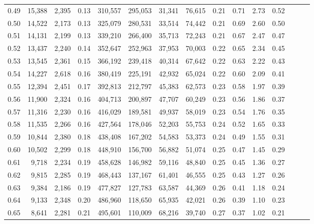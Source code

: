 \begin{tabular}{rrrrrrrrrrrrrrr}
0.49 &  15,388 &  2,395 &  0.13 &  310,557 &  295,053 &   31,341 &   76,615 &  0.21 &  0.71 &  2.73 &      0.52 \\
0.50 &  14,522 &  2,173 &  0.13 &  325,079 &  280,531 &   33,514 &   74,442 &  0.21 &  0.69 &  2.60 &      0.50 \\
0.51 &  14,131 &  2,199 &  0.13 &  339,210 &  266,400 &   35,713 &   72,243 &  0.21 &  0.67 &  2.47 &      0.47 \\
0.52 &  13,437 &  2,240 &  0.14 &  352,647 &  252,963 &   37,953 &   70,003 &  0.22 &  0.65 &  2.34 &      0.45 \\
0.53 &  13,545 &  2,361 &  0.15 &  366,192 &  239,418 &   40,314 &   67,642 &  0.22 &  0.63 &  2.22 &      0.43 \\
0.54 &  14,227 &  2,618 &  0.16 &  380,419 &  225,191 &   42,932 &   65,024 &  0.22 &  0.60 &  2.09 &      0.41 \\
0.55 &  12,394 &  2,451 &  0.17 &  392,813 &  212,797 &   45,383 &   62,573 &  0.23 &  0.58 &  1.97 &      0.39 \\
0.56 &  11,900 &  2,324 &  0.16 &  404,713 &  200,897 &   47,707 &   60,249 &  0.23 &  0.56 &  1.86 &      0.37 \\
0.57 &  11,316 &  2,230 &  0.16 &  416,029 &  189,581 &   49,937 &   58,019 &  0.23 &  0.54 &  1.76 &      0.35 \\
0.58 &  11,535 &  2,266 &  0.16 &  427,564 &  178,046 &   52,203 &   55,753 &  0.24 &  0.52 &  1.65 &      0.33 \\
0.59 &  10,844 &  2,380 &  0.18 &  438,408 &  167,202 &   54,583 &   53,373 &  0.24 &  0.49 &  1.55 &      0.31 \\
0.60 &  10,502 &  2,299 &  0.18 &  448,910 &  156,700 &   56,882 &   51,074 &  0.25 &  0.47 &  1.45 &      0.29 \\
0.61 &   9,718 &  2,234 &  0.19 &  458,628 &  146,982 &   59,116 &   48,840 &  0.25 &  0.45 &  1.36 &      0.27 \\
0.62 &   9,815 &  2,285 &  0.19 &  468,443 &  137,167 &   61,401 &   46,555 &  0.25 &  0.43 &  1.27 &      0.26 \\
0.63 &   9,384 &  2,186 &  0.19 &  477,827 &  127,783 &   63,587 &   44,369 &  0.26 &  0.41 &  1.18 &      0.24 \\
0.64 &   9,133 &  2,348 &  0.20 &  486,960 &  118,650 &   65,935 &   42,021 &  0.26 &  0.39 &  1.10 &      0.23 \\
0.65 &   8,641 &  2,281 &  0.21 &  495,601 &  110,009 &   68,216 &   39,740 &  0.27 &  0.37 &  1.02 &      0.21 \\

\end{tabular}
